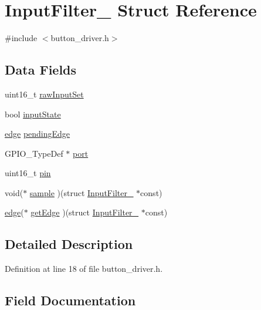 \hypertarget{struct_input_filter__}{}\section{Input\+Filter\+\_\+ Struct Reference}
\label{struct_input_filter__}


{\ttfamily \#include $<$button\+\_\+driver.\+h$>$}

\subsection*{Data Fields}
\begin{DoxyCompactItemize}
\item 
uint16\+\_\+t \mbox{\hyperlink{struct_input_filter___a295d2f6601495531b475a5965dd36c4b}{raw\+Input\+Set}}
\item 
bool \mbox{\hyperlink{struct_input_filter___a2e42fdbabb33aea9674a2f8f378ccd64}{input\+State}}
\item 
\mbox{\hyperlink{button_8h_a4ef43ff5c6d42dacbc8ffd9c8cfdc189}{edge}} \mbox{\hyperlink{struct_input_filter___a54118ea5021c85ed6693f0c268532b24}{pending\+Edge}}
\item 
G\+P\+I\+O\+\_\+\+Type\+Def $\ast$ \mbox{\hyperlink{struct_input_filter___a82241972e0292c7de95ea1e293e11be3}{port}}
\item 
uint16\+\_\+t \mbox{\hyperlink{struct_input_filter___a4144813adfa4dfe7e7cbeea17d1b06eb}{pin}}
\item 
void($\ast$ \mbox{\hyperlink{struct_input_filter___aa2061c47d432d006a5b91e831536710a}{sample}} )(struct \mbox{\hyperlink{struct_input_filter__}{Input\+Filter\+\_\+}} $\ast$const)
\item 
\mbox{\hyperlink{button_8h_a4ef43ff5c6d42dacbc8ffd9c8cfdc189}{edge}}($\ast$ \mbox{\hyperlink{struct_input_filter___a8fc896b9de0dd00ebe329df597dbc9e1}{get\+Edge}} )(struct \mbox{\hyperlink{struct_input_filter__}{Input\+Filter\+\_\+}} $\ast$const)
\end{DoxyCompactItemize}


\subsection{Detailed Description}


Definition at line 18 of file button\+\_\+driver.\+h.



\subsection{Field Documentation}
\mbox{\label{struct_input_filter___a8fc896b9de0dd00ebe329df597dbc9e1}} 
